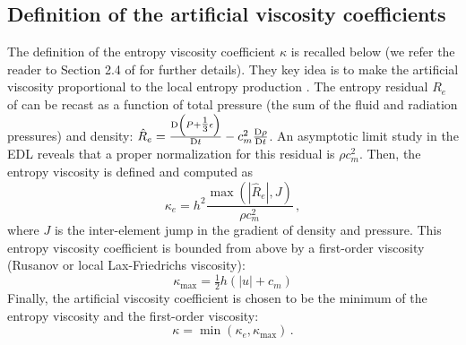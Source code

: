 \documentclass[times,doublespace]{fldauth}%
\begin{document}
\subsection{Definition of the artificial viscosity coefficients}\label{sec:visc-coeff-def}
%
The definition of the  entropy viscosity coefficient $\kappa$ is recalled below (we refer the reader to Section 2.4 of \cite{our_jcp_radhy_paper} for further details). They key idea is to make the artificial viscosity proportional to the 
local entropy production . The entropy residual $R_e$ of  can be recast
as a function of total pressure (the sum of the fluid and radiation pressures) and density: $\hat R_e = \frac{\textrm{D} \left(P+\tfrac 1 3 \epsilon\right)}{\textrm{D} t} - c^2_m \frac{\textrm{D} \rho}{\textrm{D} t}$. An asymptotic limit study in the EDL reveals that a proper normalization for this residual is $\rho c^2_m$. Then, the entropy viscosity is defined and computed as
\begin{equation}\label{eq:visc-def}
\kappa_e = h^2 \frac{\max \left( |\hat R_e|, J \right)}{\rho c^2_m} \, ,
\end{equation}
where $J$ is the inter-element jump in the gradient of density and pressure.
This entropy viscosity coefficient is bounded from above by a first-order viscosity (Rusanov or local Lax-Friedrichs viscosity):
\begin{equation}
\kappa_\text{max} = \tfrac 1 2 h \left( |u| + c_m \right) \nonumber
\end{equation}
Finally, the artificial viscosity coefficient is chosen to be the minimum of the entropy viscosity and the first-order viscosity:
\begin{equation}
\kappa = \min \left( \kappa_e, \kappa_\text{max} \right) \nonumber \,.
\end{equation}

\end{document}
